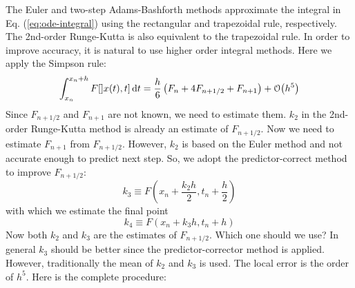 The Euler and two-step Adams-Bashforth methods approximate the integral in Eq. (\ref{eq:ode-integral}) using the rectangular and trapezoidal rule, respectively.  The 2nd-order Runge-Kutta is also equivalent to the trapezoidal rule.  In order to improve accuracy, it is natural to use higher order integral methods. Here we apply the Simpson rule:
\begin{equation}
\int_{x_n}^{x_{n}+h} F[]x(t),t] \dd{t} = \frac{h}{6} \left ( F_n + 4 F_{n+1/2} + F_{n+1} \right ) + \order{h^5}
\end{equation}
Since $F_{n+1/2}$ and $F_{n+1}$ are not known, we need to estimate them.  $k_2$ in the 2nd-order Runge-Kutta method is already an estimate of $F_{n+1/2}$. Now we need to estimate $F_{n+1}$ from $F_{n+1/2}$.  However, $k_2$ is based on the Euler method and not accurate enough to  predict next step.  So, we adopt the predictor-correct method to improve $F_{n+1/2}$:
\begin{equation}
k_3 \equiv  F (x_n+\frac{k_2 h}{2}, t_n+\frac{h}{2})
\end{equation}
with which we estimate the final point
\begin{equation}
k_4 \equiv F(x_n+k_3 h, t_n+h)
\end{equation}
Now both $k_2$ and $k_3$ are the estimates of $F_{n+1/2}$. Which one should we use?  In general $k_3$ should be better since the predictor-corrector method is applied. However, traditionally the mean of $k_2$ and $k_3$ is used. The local error is the order of $h^5$.  Here is the complete procedure:


